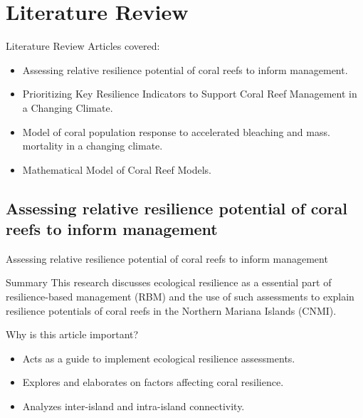 \documentclass{beamer}
\begin{document}
\section{Literature Review}
\begin{frame}{Literature Review}
Articles covered:
\begin{itemize}
    \item Assessing relative resilience potential of coral reefs to inform management.
    \item Prioritizing Key Resilience Indicators to Support Coral Reef Management in a Changing Climate.
    \item Model of coral population response to accelerated bleaching and mass.
mortality in a changing climate.
    \item Mathematical Model of Coral Reef Models.
\end{itemize}
\end{frame}

\subsection{Assessing relative resilience potential of coral reefs to inform management}
\begin{frame}{Assessing relative resilience potential of coral reefs to inform management \cite{assesing_relative}}
    \begin{block}{Summary}
        \small{This research discusses ecological resilience as a essential part of resilience-based management (RBM) and the use of such assessments to explain resilience potentials of coral reefs in the Northern Mariana Islands (CNMI).}
    \end{block}
    Why is this article important?
    \begin{itemize}
        \item Acts as a guide to implement ecological resilience assessments.
        \item Explores and elaborates on factors affecting coral resilience.
        \item Analyzes inter-island and intra-island connectivity.
    \end{itemize}
\end{frame}
\end{document}
